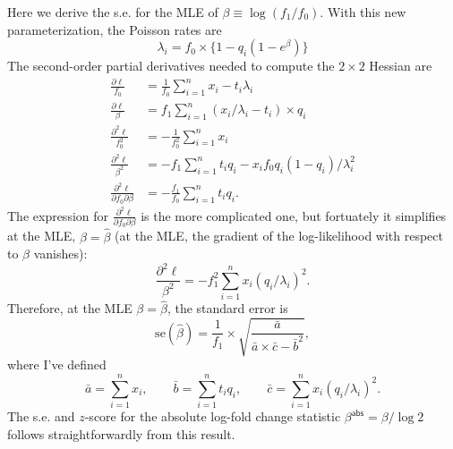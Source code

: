 \documentclass[final]{siamart171218}
\begin{document}
Here we derive the s.e. for the MLE of $\beta \equiv \log (f_1/f_0)$. 
With this new parameterization, the Poisson rates are
\begin{equation}
\lambda_i = f_0 \times \{1 - q_i(1-e^{\beta})\}
\end{equation}
The second-order partial derivatives needed to compute the $2 \times
2$ Hessian are
\begin{align}
\frac{\partial\ell}{f_0} &= \frac{1}{f_0} \sum_{i=1}^n 
x_i - t_i\lambda_i \\
\frac{\partial\ell}{\beta} &= f_1 \sum_{i=1}^n 
(x_i/\lambda_i - t_i) \times q_i \\
\frac{\partial^2\ell}{f_0^2} &=
-\frac{1}{f_0^2} \sum_{i=1}^n x_i \\
\frac{\partial^2\ell}{\beta^2} &= 
-f_1 \sum_{i=1}^n t_i q_i - x_i f_0 q_i (1-q_i)/\lambda_i^2 \\
\frac{\partial^2\ell}{\partial f_0 \partial\beta} &= 
-\frac{f_1}{f_0} \sum_{i=1}^n t_i q_i.
\end{align}
The expression for $\frac{\partial^2\ell}{\partial f_0 \partial\beta}$
is the more complicated one, but fortuately it simplifies at the MLE,
$\beta = \hat{\beta}$ (at the MLE, the gradient of the log-likelihood
with respect to $\beta$ vanishes):
\begin{equation}
\frac{\partial^2\ell}{\beta^2} = -f_1^2 \sum_{i=1}^n x_i (q_i/\lambda_i)^2.
\end{equation}
Therefore, at the MLE $\beta = \hat{\beta}$, the standard error is
\begin{equation}
\mathrm{se}(\hat{\beta}) = \frac{1}{f_1} \times 
\sqrt{\frac{\bar{a}}{\bar{a} \times \bar{c} - \bar{b}^2}},
\end{equation}
where I've defined
\begin{equation*}
\bar{a} = \sum_{i=1}^n x_i, \qquad
\bar{b} = \sum_{i=1}^n t_i q_i, \qquad
\bar{c} = \sum_{i=1}^n x_i (q_i/\lambda_i)^2.
\end{equation*}
The s.e. and $z$-score for the absolute log-fold change statistic
$\beta^{\mathsf{abs}} = \beta/\log 2$ follows
straightforwardly from this result.



\end{document}
